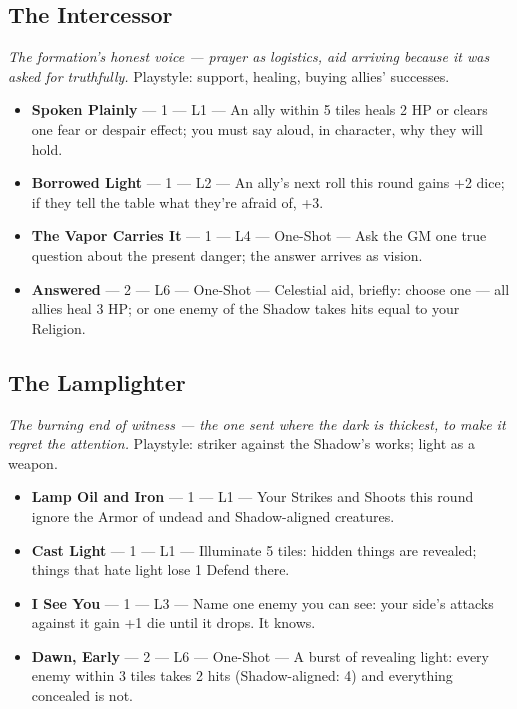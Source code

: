 \subsection{The Intercessor}
\textit{The formation's honest voice --- prayer as logistics, aid arriving because it was asked for truthfully.} Playstyle: support, healing, buying allies' successes.
\begin{itemize}
    \item \textbf{Spoken Plainly} --- 1 --- L1 --- An ally within 5 tiles heals 2 HP or clears one fear or despair effect; you must say aloud, in character, why they will hold.
    \item \textbf{Borrowed Light} --- 1 --- L2 --- An ally's next roll this round gains +2 dice; if they tell the table what they're afraid of, +3.
    \item \textbf{The Vapor Carries It} --- 1 --- L4 --- One-Shot --- Ask the GM one true question about the present danger; the answer arrives as vision.
    \item \textbf{Answered} --- 2 --- L6 --- One-Shot --- Celestial aid, briefly: choose one --- all allies heal 3 HP; or one enemy of the Shadow takes hits equal to your Religion.
\end{itemize}

\subsection{The Lamplighter}
\textit{The burning end of witness --- the one sent where the dark is thickest, to make it regret the attention.} Playstyle: striker against the Shadow's works; light as a weapon.
\begin{itemize}
    \item \textbf{Lamp Oil and Iron} --- 1 --- L1 --- Your Strikes and Shoots this round ignore the Armor of undead and Shadow-aligned creatures.
    \item \textbf{Cast Light} --- 1 --- L1 --- Illuminate 5 tiles: hidden things are revealed; things that hate light lose 1 Defend there.
    \item \textbf{I See You} --- 1 --- L3 --- Name one enemy you can see: your side's attacks against it gain +1 die until it drops. It knows.
    \item \textbf{Dawn, Early} --- 2 --- L6 --- One-Shot --- A burst of revealing light: every enemy within 3 tiles takes 2 hits (Shadow-aligned: 4) and everything concealed is not.
\end{itemize}

